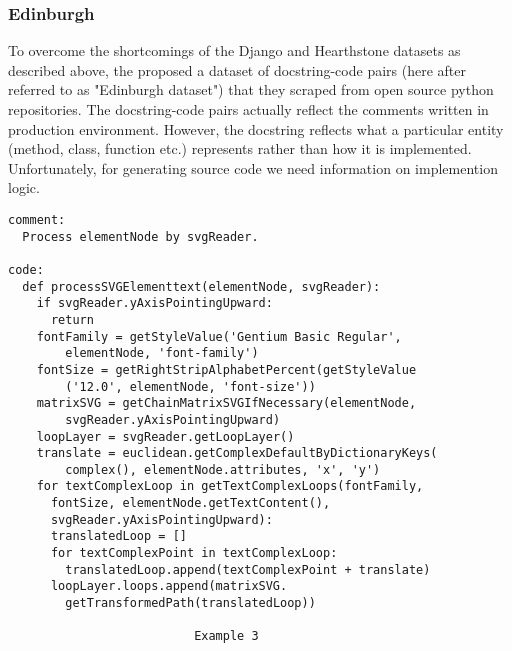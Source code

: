 \documentclass{IEEEtran}
\begin{document}
      \subsubsection{Edinburgh}
To overcome the shortcomings of the Django and Hearthstone datasets as                                                                                            
        described above, the \cite{barone2017} proposed a dataset of                                                                                             
        docstring-code pairs (here after referred to as "Edinburgh dataset") that                                                                                         
        they scraped from open source python repositories. The docstring-code                                                                                             
        pairs actually reflect the comments written in production environment. However,                                                                                          
        the docstring reflects what a particular entity (method, class, function etc.)                                                                                    
        represents rather than how it is implemented. Unfortunately, for generating                                                                                       
        source code we need information on implemention logic. \\
      \begin{lstlisting}[frame=single,basicstyle=\scriptsize]
comment:
  Process elementNode by svgReader.

code:
  def processSVGElementtext(elementNode, svgReader):
    if svgReader.yAxisPointingUpward:
      return
    fontFamily = getStyleValue('Gentium Basic Regular', 
        elementNode, 'font-family')
    fontSize = getRightStripAlphabetPercent(getStyleValue
        ('12.0', elementNode, 'font-size'))
    matrixSVG = getChainMatrixSVGIfNecessary(elementNode, 
        svgReader.yAxisPointingUpward)
    loopLayer = svgReader.getLoopLayer()
    translate = euclidean.getComplexDefaultByDictionaryKeys(
        complex(), elementNode.attributes, 'x', 'y')
    for textComplexLoop in getTextComplexLoops(fontFamily, 
      fontSize, elementNode.getTextContent(), 
      svgReader.yAxisPointingUpward):
      translatedLoop = []
      for textComplexPoint in textComplexLoop:
        translatedLoop.append(textComplexPoint + translate)
      loopLayer.loops.append(matrixSVG.
        getTransformedPath(translatedLoop))

                          Example 3
      \end{lstlisting}
\end{document}
